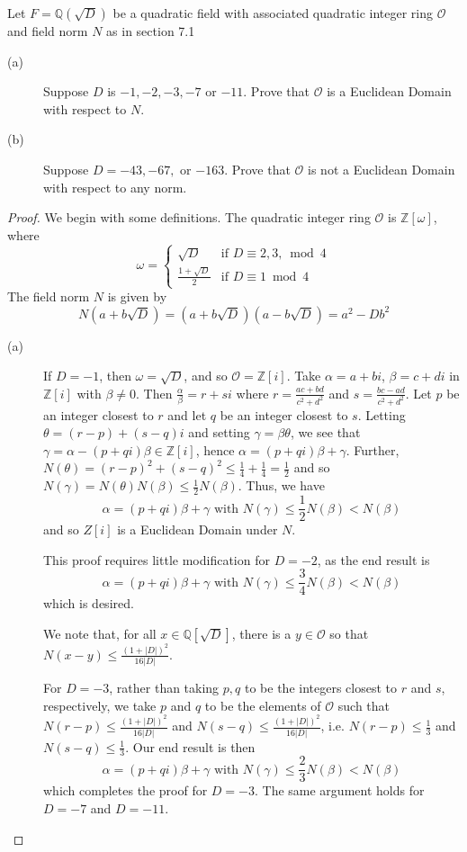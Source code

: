 \documentclass[12pt,leqno]{book}
\numberwithin{equation}{section}
\newcommand{\question}[2] {\vspace{.25in}\noindent\fbox{#1} #2 \vspace{.10in}}
\theoremstyle{definition}
\begin{document}
\question{8}{Let $F=\mathbb{Q}(\sqrt{D})$ be a quadratic field with associated quadratic integer ring $\mathcal{O}$ and field norm $N$ as in section 7.1}
\begin{description}
 \item [(a)] Suppose $D$ is $-1,-2,-3,-7$ or $-11$. Prove that $\mathcal{O}$ is a Euclidean Domain with respect to $N$.
 \item [(b)] Suppose $D=-43,-67,$ or $-163$. Prove that $\mathcal{O}$ is not a Euclidean Domain with respect to any norm.
\end{description}

\begin{proof}
 We begin with some definitions. The quadratic integer ring $\mathcal{O}$ is $\mathbb{Z}[\omega]$, where \[\omega=\begin{cases}\sqrt{D}&\text{if }D\equiv2,3,\bmod{4}\\\frac{1+\sqrt{D}}{2}&\text{if }D\equiv1\bmod{4}\end{cases}\] The field norm $N$ is given by \[N(a+b\sqrt{D})=(a+b\sqrt{D})(a-b\sqrt{D})=a^2-Db^2\]
\begin{description}
 \item [(a)] If $D=-1$, then $\omega=\sqrt{D}$, and so $\mathcal{O}=\mathbb{Z}[i]$. Take $\alpha=a+bi$, $\beta=c+di$ in $\mathbb{Z}[i]$ with $\beta\not=0$. Then $\frac{\alpha}{\beta}=r+si$ where $r=\frac{ac+bd}{c^2+d^2}$ and $s=\frac{bc-ad}{c^2+d^2}$. Let $p$ be an integer closest to $r$ and let $q$ be an integer closest to $s$. Letting $\theta=(r-p)+(s-q)i$ and setting $\gamma=\beta\theta$, we see that $\gamma=\alpha-(p+qi)\beta\in\mathbb{Z}[i]$, hence $\alpha=(p+qi)\beta+\gamma$. Further, $N(\theta)=(r-p)^2+(s-q)^2\leq\frac{1}{4}+\frac{1}{4}=\frac{1}{2}$ and so $N(\gamma)=N(\theta)N(\beta)\leq\frac{1}{2}N(\beta)$. Thus, we have \[\alpha=(p+qi)\beta+\gamma\text{ with }N(\gamma)\leq\frac{1}{2}N(\beta)<N(\beta)\] and so $Z[i]$ is a Euclidean Domain under $N$.

This proof requires little modification for $D=-2$, as the end result is \[\alpha=(p+qi)\beta+\gamma\text{ with }N(\gamma)\leq\frac{3}{4}N(\beta)<N(\beta)\] which is desired. 

We note that, for all $x\in\mathbb{Q}[\sqrt{D}]$, there is a $y\in\mathcal{O}$ so that $N(x-y)\leq\frac{(1+|D|)^2}{16|D|}$. 

For $D=-3$, rather than taking $p,q$ to be the integers closest to $r$ and $s$, respectively, we take $p$ and $q$ to be the elements of $\mathcal{O}$ such that $N(r-p)\leq\frac{(1+|D|)^2}{16|D|}$ and $N(s-q)\leq\frac{(1+|D|)^2}{16|D|}$, i.e. $N(r-p)\leq\frac{1}{3}$ and $N(s-q)\leq\frac{1}{3}$. Our end result is then \[\alpha=(p+qi)\beta+\gamma\text{ with }N(\gamma)\leq\frac{2}{3}N(\beta)<N(\beta)\] which completes the proof for $D=-3$. The same argument holds for $D=-7$ and $D=-11$.


\end{description}
\end{proof}
\end{document}
